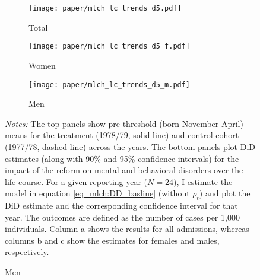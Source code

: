 \begin{landscape}
	\vspace*{\fill}
	\begin{figure}[H]\centering
		\caption{Life-course approach for mental and behavioral disorders}\label{fig_mlch: lc_d5_frg_DD}
		\begin{subfigure}[h]{0.31\linewidth}\centering\caption{Total}
			\texttt{[image: paper/mlch\_lc\_trends\_d5.pdf]}
		\end{subfigure}
		\begin{subfigure}[h]{0.31\linewidth}\centering\caption{Women}
			\texttt{[image: paper/mlch\_lc\_trends\_d5\_f.pdf]}
		\end{subfigure}
		\begin{subfigure}[h]{0.31\linewidth}\centering\caption{Men}
			\texttt{[image: paper/mlch\_lc\_trends\_d5\_m.pdf]}
		\end{subfigure}
		\scriptsize
		\begin{minipage}{\linewidth}
			\emph{Notes:} The top panels show pre-threshold (born November-April) means for the treatment (1978/79, solid line) and control cohort (1977/78, dashed line) across the years. The bottom panels plot DiD estimates (along with 90\% and 95\% confidence intervals) for the impact of the reform on mental and behavioral disorders over the life-course. For a given reporting year ($N=24$), I estimate the model in equation \ref{eq_mlch:DD_basline} (without $\rho_t$) and plot the DiD estimate and the corresponding confidence interval for that year. The outcomes are defined as the number of cases per 1,000 individuals. Column a shows the results for all admissions, whereas columns b and c show the estimates for females and males, respectively.
		\end{minipage}
	\end{figure}
	\vspace*{\fill}\clearpage
\end{landscape}
\restoregeometry



%

 

